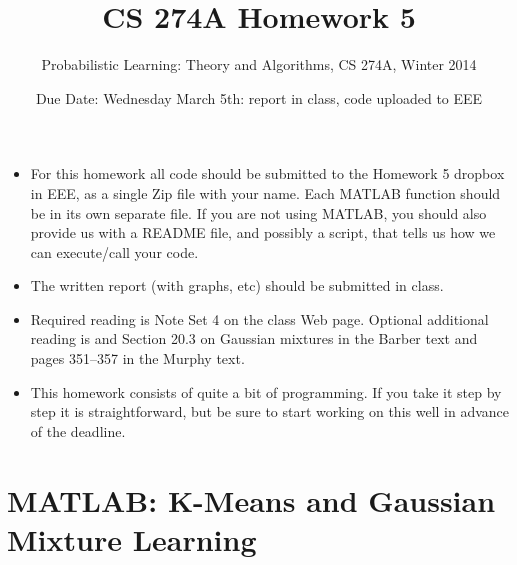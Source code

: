 \documentclass[11pt,psfig]{article}
\begin{document}
\setlength{\parskip}{1.2ex plus0.3ex minus 0.3ex}


\thispagestyle{empty} \pagestyle{myheadings} 



\title{CS 274A Homework 5}
\author{Probabilistic Learning: Theory and Algorithms, CS 274A, Winter 2014}
\date{Due Date: Wednesday March 5th: report in class, code uploaded to EEE}

\maketitle




%
 
\begin{itemize}
\item For this homework all code should be submitted to the Homework 5 dropbox in EEE, as a single Zip file with your name. Each MATLAB function should be in its own separate file.  If you are not using MATLAB, you should also provide us with a README file, and possibly a script, that tells us how we can execute/call your code.
    
\item The written report (with graphs, etc) should be submitted in class.

\item Required reading is Note Set 4 on the class Web page.
Optional additional reading is  
and Section 20.3 on Gaussian mixtures in the Barber text and
 pages 351--357 in the Murphy text.
 
\item This  homework consists of quite a bit of programming. If you take it
step by step it is straightforward, but be sure to start working on this well
in advance of the deadline. 
     
\end{itemize}

 \newpage





\section*{MATLAB: K-Means and Gaussian Mixture Learning}
\end{document}
